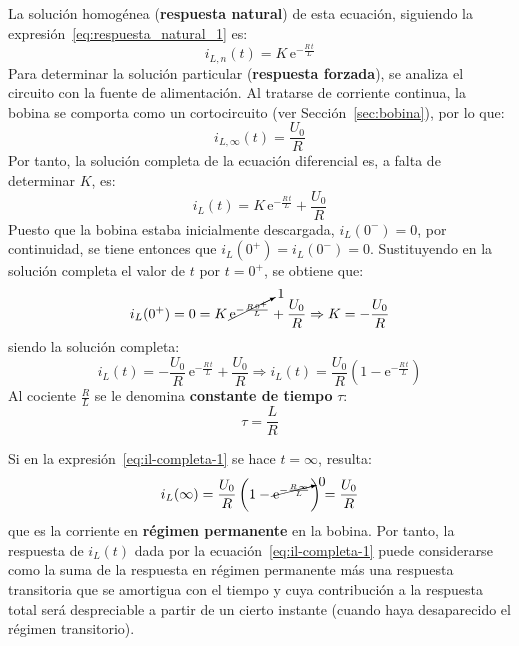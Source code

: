 La solución homogénea (\textbf{respuesta natural}) de esta ecuación,
siguiendo la expresión~\eqref{eq:respuesta_natural_1} es:
\begin{equation}
  \boxed{i_{L,n}(t)=K\,\mathrm{e}^{-\frac{R\,t}{L}}}
\end{equation}
Para determinar la solución particular (\textbf{respuesta forzada}),
se analiza el circuito con la fuente de alimentación. Al tratarse de
corriente continua, la bobina se comporta como un cortocircuito (ver
Sección~\ref{sec:bobina}), por lo que:
\begin{equation}
  \boxed{i_{L,\infty}(t)=\dfrac{U_0}{R}}
\end{equation}
Por tanto, la solución completa de la ecuación diferencial es, a falta
de determinar $K$, es:
\begin{equation}\label{eq:il-completa-1-sinK}
  i_L(t)=K\,\mathrm{e}^{-\frac{R\,t}{L}}+\dfrac{U_0}{R}
\end{equation}
Puesto que la bobina estaba inicialmente descargada, $i_L(0^-)=0$, por
continuidad, se tiene entonces que $i_L(0^+)=i_L(0^-)=0$. Sustituyendo
en la solución completa el valor de $t$ por $t=0^+$, se obtiene que:
\begin{equation*}
  i_L(0^+)=0=K\,\cancelto{1}{\mathrm{e}^{-\frac{R\,0^+}{L}}}+\dfrac{U_0}{R}\Rightarrow K=-\dfrac{U_0}{R}
\end{equation*}
siendo la solución completa:
\begin{equation}\label{eq:il-completa-1}
  i_L(t)=-\dfrac{U_0}{R}\,\mathrm{e}^{-\frac{R\,t}{L}}+\dfrac{U_0}{R} \Rightarrow \boxed{i_L(t) =\dfrac{U_0}{R}\left(1- \mathrm{e}^{-\frac{R\,t}{L}}\right)}
\end{equation}
Al cociente $\frac{R}{L}$ se le denomina \textbf{constante de tiempo}
$\tau$:
\begin{equation}
  \boxed{\tau=\dfrac{L}{R}}
\end{equation}
	
Si en la expresión~\eqref{eq:il-completa-1} se hace $t=\infty$,
resulta:
\begin{equation*}
  i_L(\infty) =\dfrac{U_0}{R}\left(1- \cancelto{0}{\mathrm{e}^{-\frac{R\,\infty}{L}}}\right)=\dfrac{U_0}{R}
\end{equation*}
que es la corriente en \textbf{régimen permanente} en la bobina. Por
tanto, la respuesta de $i_L(t)$ dada por la
ecuación~\eqref{eq:il-completa-1} puede considerarse como la suma de
la respuesta en régimen permanente más una respuesta transitoria que
se amortigua con el tiempo y cuya contribución a la respuesta total
será despreciable a partir de un cierto instante (cuando haya
desaparecido el régimen transitorio).
	
